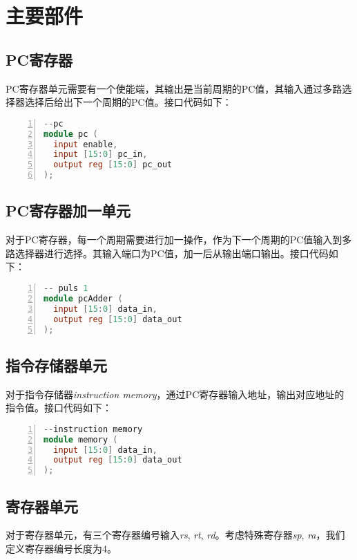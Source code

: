 \section{主要部件}
\subsection{PC寄存器}
PC寄存器单元需要有一个使能端，其输出是当前周期的PC值，其输入通过多路选择器选择后给出下一个周期的PC值。接口代码如下：

\begin{lstlisting}[language=verilog,frame=single,breaklines,breaklines,basicstyle=\footnotesize\ttfamily,numbers=left]
--pc
module pc (
  input enable,
  input [15:0] pc_in,
  output reg [15:0] pc_out
);
\end{lstlisting}

\subsection{PC寄存器加一单元}
对于PC寄存器，每一个周期需要进行加一操作，作为下一个周期的PC值输入到多路选择器进行选择。其输入端口为PC值，加一后从输出端口输出。接口代码如下：

\begin{lstlisting}[language=verilog,frame=single,breaklines,breaklines,basicstyle=\footnotesize\ttfamily,numbers=left]
-- puls 1
module pcAdder (
  input [15:0] data_in,
  output reg [15:0] data_out
);
\end{lstlisting}

\subsection{指令存储器单元}
对于指令存储器\emph{instruction memory}，通过PC寄存器输入地址，输出对应地址的指令值。接口代码如下：

\begin{lstlisting}[language=verilog,frame=single,breaklines,breaklines,basicstyle=\footnotesize\ttfamily,numbers=left]
--instruction memory
module memory (
  input [15:0] data_in,
  output reg [15:0] data_out
);
\end{lstlisting}

\subsection{寄存器单元}
对于寄存器单元，有三个寄存器编号输入\emph{rs}, \emph{rt}, \emph{rd}。考虑特殊寄存器\emph{sp}, \emph{ra}，我们定义寄存器编号长度为4。

